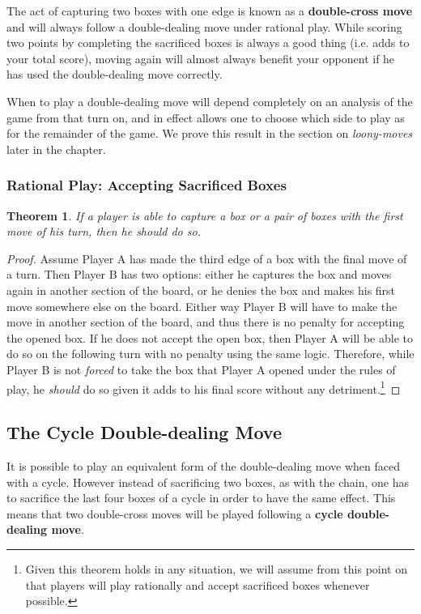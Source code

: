 \documentclass[12pt,twoside]{reedthesis}
\newtheorem{theorem}{Theorem}
\begin{document}
The act of capturing two boxes with one edge is known as a \textbf{double-cross move} and will always follow a double-dealing move under rational play.  While scoring two points by completing the sacrificed boxes is always a good thing (i.e. adds to your total score), moving again will almost always benefit your opponent if he has used the double-dealing move correctly.

When to play a double-dealing move will depend completely on an analysis of the game from that turn on, and in effect allows one to choose which side to play as for the remainder of the game.  We prove this result in the section on \emph{loony-moves} later in the chapter.

\subsubsection{Rational Play: Accepting Sacrificed Boxes}
\begin{theorem}
If a player is able to capture a box or a pair of boxes with the first move of his turn, then he should do so.
\end{theorem}

\begin{proof}
Assume Player A has made the third edge of a box with the final move of a turn.  Then Player B has two options: either he captures the box and moves again in another section of the board, or he denies the box and makes his first move somewhere else on the board.  Either way Player B will have to make the move in another section of the board, and thus there is no penalty for accepting the opened box.  If he does not accept the open box, then Player A will be able to do so on the following turn with no penalty using the same logic.  Therefore, while Player B is not \emph{forced} to take the box that Player A opened under the rules of play, he \emph{should} do so given it adds to his final score without any detriment.\footnote[1]{Given this theorem holds in any situation, we will assume from this point on that players will play rationally and accept sacrificed boxes whenever possible.}
\end{proof}

\subsection{The Cycle Double-dealing Move}
It is possible to play an equivalent form of the double-dealing move when faced with a cycle.  However instead of sacrificing two boxes, as with the chain, one has to sacrifice the last four boxes of a cycle in order to have the same effect.  This means that two double-cross moves will be played following a \textbf{cycle double-dealing move}.
\end{document}
